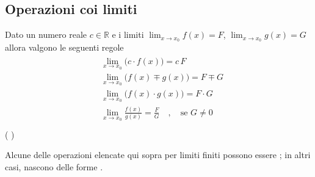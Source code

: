 \documentclass[letterpaper,10pt,italian]{jupyterBook}
\begin{document}
\subsection{Operazioni coi limiti}
\label{\detokenize{ch/infinitesimal_calculus/analysis:operazioni-coi-limiti}}\label{\detokenize{ch/infinitesimal_calculus/analysis:infinitesimal-calculus-limits-thms-operations}}
\sphinxAtStartPar
Dato un numero reale \(c \in \mathbb{R}\) e i limiti  \(\lim_{x \rightarrow x_0} f(x) = F\), \(\lim_{x \rightarrow x_0} g(x) = G\) allora valgono le seguenti regole
\begin{equation*}
\begin{split}\begin{aligned}
 & \lim_{x \rightarrow x_0} \big( c \cdot f(x) \big) = c \, F  \\
 & \lim_{x \rightarrow x_0} \big( f(x) \mp g(x) \big) = F \mp G \\
 & \lim_{x \rightarrow x_0} \big( f(x) \cdot g(x) \big) = F \cdot G \\
 & \lim_{x \rightarrow x_0} \frac{ f(x) }{ g(x) } = \frac{F}{G} \quad , \quad \text{se $G \ne 0$}  \\
\end{aligned}\end{split}
\end{equation*}
\sphinxAtStartPar
( )

\sphinxAtStartPar
Alcune delle operazioni elencate qui sopra per limiti finiti possono essere {\hyperref[\detokenize{ch/infinitesimal_calculus/analysis:infinitesimal-calculus-limits-thms-infinite-simal}]{}}; in altri casi, nascono delle forme {\hyperref[\detokenize{ch/infinitesimal_calculus/analysis:infinitesimal-calculus-limits-thms-infinite-simal-undetermined}]{}}.
\end{document}
